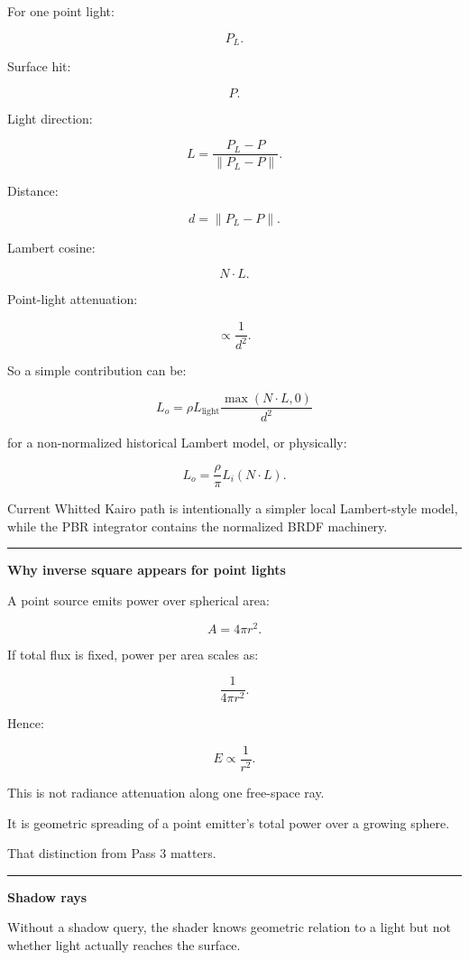 For one point light:

\[
P_L.
\]

Surface hit:

\[
P.
\]

Light direction:

\[
L=
\frac{P_L-P}
{\|P_L-P\|}.
\]

Distance:

\[
d=
\|P_L-P\|.
\]

Lambert cosine:

\[
N\cdot L.
\]

Point-light attenuation:

\[
\propto
\frac1{d^2}.
\]

So a simple contribution can be:

\[
\boxed{
L_o
=
\rho
L_{\text{light}}
\frac{
\max(N\cdot L,0)
}{
d^2
}
}
\]

for a non-normalized historical Lambert model, or physically:

\[
\boxed{
L_o
=
\frac{\rho}{\pi}
L_i
(N\cdot L).
}
\]

Current Whitted Kairo path is intentionally a simpler local Lambert-style model, while the PBR integrator contains the normalized BRDF machinery.

\begin{center}\rule{0.5\linewidth}{0.5pt}\end{center}

\textbf{Why inverse square appears for point lights}

A point source emits power over spherical area:

\[
A=4\pi r^2.
\]

If total flux is fixed, power per area scales as:

\[
\frac1{4\pi r^2}.
\]

Hence:

\[
\boxed{
E\propto\frac1{r^2}.
}
\]

This is not radiance attenuation along one free-space ray.

It is geometric spreading of a point emitter's total power over a growing sphere.

That distinction from Pass 3 matters.

\begin{center}\rule{0.5\linewidth}{0.5pt}\end{center}

\textbf{Shadow rays}

Without a shadow query, the shader knows geometric relation to a light but not whether light actually reaches the surface.

